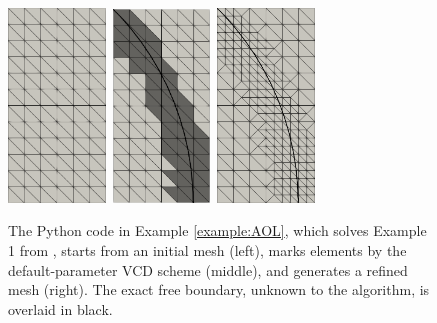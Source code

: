 \documentclass[]{interact}
\theoremstyle{plain}%
\theoremstyle{definition}
\theoremstyle{remark}
\begin{document}
\begin{figure}[ht]
\centering
\mbox{\includegraphics[width=0.23\textwidth]{static/aol-mesh0.png} \qquad\quad
\includegraphics[width=0.23\textwidth]{static/aol-marked.png} \qquad\quad
\includegraphics[width=0.23\textwidth]{static/aol-mesh1.png}}
\caption{The Python code in Example \ref{example:AOL}, which solves Example 1 from \cite{AinsworthOdenLee1993}, starts from an initial mesh (left), marks elements by the default-parameter VCD scheme (middle), and generates a refined mesh (right).  The exact free boundary, unknown to the algorithm, is overlaid in black.}
\label{fig:resultAOL}
\end{figure}
\end{document}
